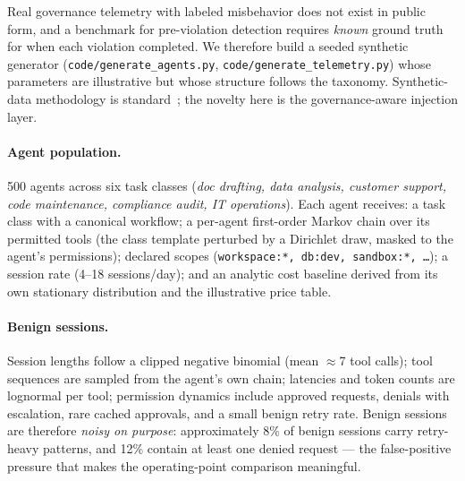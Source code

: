 \documentclass[10pt]{article}
\newcommand{\code}[1]{\texttt{#1}}
\begin{document}
Real governance telemetry with labeled misbehavior does not exist in public
form, and a benchmark for pre-violation detection requires \emph{known} ground
truth for when each violation completed. We therefore build a seeded synthetic
generator (\code{code/generate\_agents.py}, \code{code/generate\_telemetry.py})
whose parameters are illustrative but whose structure follows the taxonomy.
Synthetic-data methodology is standard~\cite{syntheticdata}; the novelty here
is the governance-aware injection layer.

\paragraph{Agent population.} 500 agents across six task classes
(\emph{doc drafting, data analysis, customer support, code maintenance,
compliance audit, IT operations}). Each agent receives: a task class with a
canonical workflow; a per-agent first-order Markov chain over its permitted
tools (the class template perturbed by a Dirichlet draw, masked to the agent's
permissions); declared scopes (\code{workspace:*, db:dev, sandbox:*, \dots});
a session rate (4--18 sessions/day); and an analytic cost baseline derived
from its own stationary distribution and the illustrative price table.

\paragraph{Benign sessions.} Session lengths follow a clipped negative binomial
(mean $\approx$7 tool calls); tool sequences are sampled from the agent's own
chain; latencies and token counts are lognormal per tool; permission dynamics
include approved requests, denials with escalation, rare cached approvals, and
a small benign retry rate. Benign sessions are therefore \emph{noisy on
purpose}: approximately 8\% of benign sessions carry retry-heavy patterns, and
12\% contain at least one denied request --- the false-positive pressure that
makes the operating-point comparison meaningful.
\end{document}
